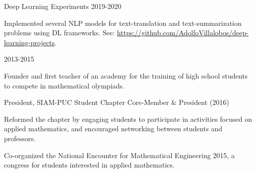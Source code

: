 
\begin{cventries}


  \cventry
  {Deep Learning Experiments}
  {}
  {}
  {2019-2020}{
  \begin{cvitems}
   \item {Implemented several NLP models for text-translation and text-summarization problems using DL frameworks. See: \url{https://github.com/AdolfoVillalobos/deep-learning-projects}.}
  \end{cvitems}
   }


\end{cventries}

\begin{cventries}
  {}
  {}
  {2013-2015}
  {\begin{cvitems}
    \item {Founder and first teacher of an academy for the training of high school students to compete in mathematical olympiads.}
  \end{cvitems}
}
  \cventry
  {President, SIAM-PUC Student Chapter}
  {}
  {}
  {Core-Member \& President (2016)}
  {
    \begin{cvitems}
      \item {Reformed the chapter by engaging students to participate in activities focused 
        on applied mathematics, and encouraged networking between students and professors.}
      \item {Co-organized the National Encounter for Mathematical Engineering 2015, a congress for students interested in applied mathematics.}
    \end{cvitems}
    }
\end{cventries}

 

